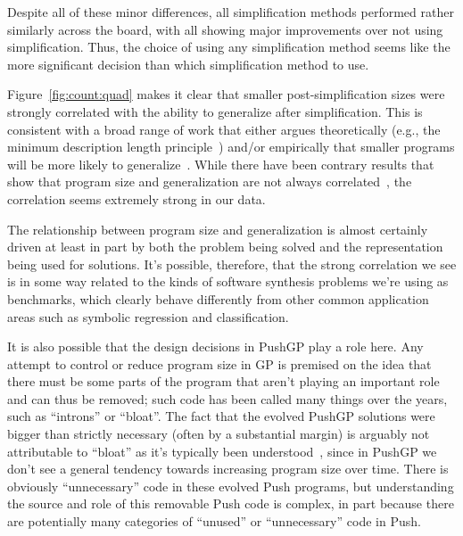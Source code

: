 Despite all of these minor differences, all simplification methods performed rather similarly across the board, with all showing major improvements over not using simplification. Thus, the choice of using any simplification method seems like the more significant decision than which simplification method to use.


Figure~\ref{fig:count:quad} makes it clear that
smaller post-simplification sizes were strongly correlated with the
ability to generalize after simplification. This is consistent with 
a broad range of work that either argues theoretically (e.g., the minimum
description length principle~\cite{iba1994genetic, zhang1995balancing}) 
and/or empirically
that smaller programs will be more likely to generalize~\cite{rosca:1996:gVsGP}.
While there have been contrary results that show that program size and
generalization are not always correlated~\cite{silva2012operator}, the
correlation seems extremely strong in our data. 

The relationship between
program size and generalization is almost certainly driven at least in part
by both the problem being solved and the representation being used for
solutions. It's possible, therefore, that the strong correlation we see
is in some way related to the kinds of software synthesis problems we're using
as benchmarks, which clearly behave differently from other common application areas such as symbolic regression and classification. 

It is also possible that the design decisions in PushGP play a role here. Any
attempt to control or reduce program size in GP is premised on the idea that
there must be some parts of the program that aren't playing an important role
and can thus be removed; such code has been called many things over the years,
such as ``introns'' or ``bloat''. The fact that the evolved PushGP solutions
were bigger than strictly necessary (often by a substantial margin) is arguably
not attributable to ``bloat'' as it's typically been 
understood~\cite{poli08:fieldguide}, since in PushGP we don't see a 
general tendency towards increasing program size over time. 
There is obviously ``unnecessary'' code in these evolved Push programs, but understanding the source and role of this removable Push 
code is complex, in part because there are potentially many categories 
of ``unused'' or ``unnecessary'' code
in Push.

